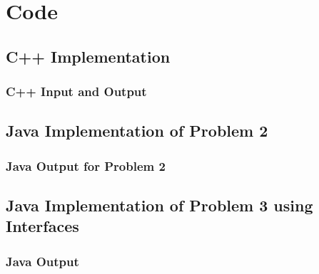 \documentclass[11pt]{article}
\begin{document}
\section{Code}
\subsection{C++ Implementation}



\subsubsection{C++ Input and Output}


\subsection{Java Implementation of Problem 2}




\subsubsection{Java Output for Problem 2}


\subsection{Java Implementation of Problem 3 using Interfaces} 




\subsubsection{Java Output}

\end{document}
